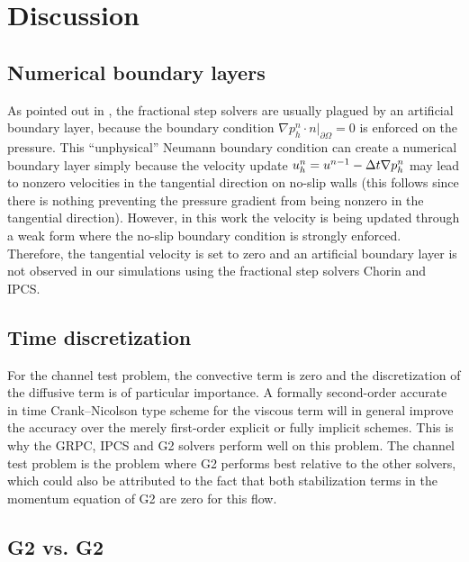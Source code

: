 \section{Discussion}
\label{Discussion}

\subsection{Numerical boundary layers}

As pointed out in \citet{GuermondMinevShen2006}, the fractional step
solvers are usually plagued by an artificial boundary layer, because
the boundary condition $ \nabla p^n_h \cdot n |_{\partial\Omega}=0$ is
enforced on the pressure. This ``unphysical'' Neumann boundary condition
can create a numerical boundary layer simply because the velocity
update $u^{n}_h=u^{n-1}-\Delta t\nabla p^n_h$ may lead to nonzero
velocities in the tangential direction on no-slip walls (this follows
since there is nothing preventing the pressure gradient from being
nonzero in the tangential direction). However, in this work the
velocity is being updated through a weak form where the no-slip
boundary condition is strongly enforced. Therefore, the tangential
velocity is set to zero and an artificial boundary layer is not
observed in our simulations using the fractional step solvers Chorin
and IPCS.

\subsection{Time discretization}

For the channel test problem, the convective term is zero and the
discretization of the diffusive term is of particular importance. A
formally second-order accurate in time Crank--Nicolson type scheme for
the viscous term will in general improve the accuracy over the merely
first-order explicit or fully implicit schemes. This is why the GRPC,
IPCS and G2 solvers perform well on this problem. The channel test
problem is the problem where G2 performs best relative to the other
solvers, which could also be attributed to the fact that both
stabilization terms in the momentum equation of G2 are zero for this
flow.

\subsection{G2 vs. G2}
\label{sec:g2comment}

